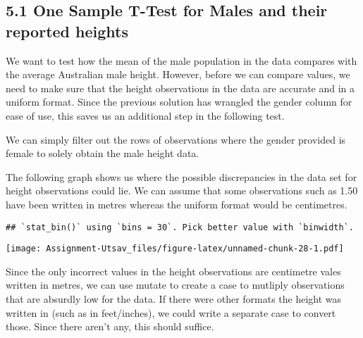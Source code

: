 \documentclass[
]{article}
\newenvironment{Shaded}{\begin{snugshade}}{\end{snugshade}}
\newcommand{\DataTypeTok}[1]{\textcolor[rgb]{0.13,0.29,0.53}{#1}}
\newcommand{\KeywordTok}[1]{\textcolor[rgb]{0.13,0.29,0.53}{\textbf{#1}}}
\newcommand{\NormalTok}[1]{#1}
\newcommand{\OperatorTok}[1]{\textcolor[rgb]{0.81,0.36,0.00}{\textbf{#1}}}
\newcommand{\StringTok}[1]{\textcolor[rgb]{0.31,0.60,0.02}{#1}}
\begin{document}
\hypertarget{one-sample-t-test-for-males-and-their-reported-heights}{%
\subsection{5.1 One Sample T-Test for Males and their reported
heights}\label{one-sample-t-test-for-males-and-their-reported-heights}}

We want to test how the mean of the male population in the data compares
with the average Australian male height. However, before we can compare
values, we need to make sure that the height observations in the data
are accurate and in a uniform format. Since the previous solution has
wrangled the gender column for ease of use, this saves us an additional
step in the following test.

We can simply filter out the rows of observations where the gender
provided is female to solely obtain the male height data.

\begin{Shaded}
\end{Shaded}

The following graph shows us where the possible discrepancies in the
data set for height observations could lie. We can assume that some
observations such as 1.50 have been written in metres whereas the
uniform format would be centimetres.

\begin{Shaded}
\end{Shaded}

\begin{verbatim}
## `stat_bin()` using `bins = 30`. Pick better value with `binwidth`.
\end{verbatim}

\texttt{[image: Assignment-Utsav\_files/figure-latex/unnamed-chunk-28-1.pdf]}

Since the only incorrect values in the height observations are
centimetre vales written in metres, we can use mutate to create a case
to mutliply observations that are absurdly low for the data. If there
were other formats the height was written in (such as in feet/inches),
we could write a separate case to convert those. Since there aren't any,
this should suffice.
\end{document}
